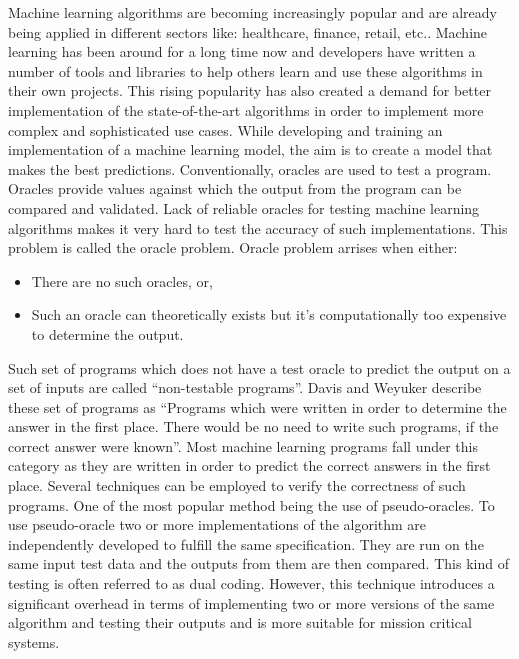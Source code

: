 Machine learning algorithms are becoming increasingly popular and are already being applied in different sectors like: healthcare, finance, retail, etc.. Machine learning has been around for a long time now and developers have written a number of tools and libraries to help others learn and use these algorithms in their own projects. This rising popularity has also created a demand for better implementation of the state-of-the-art algorithms in order to implement more complex and sophisticated use cases. While developing and training an implementation of a machine learning model, the aim is to create a model that makes the best predictions.
Conventionally, oracles are used to test a program. Oracles provide values against which the output from the program can be compared and validated. Lack of reliable oracles for testing machine learning algorithms makes it very hard to test the accuracy of such implementations. This problem is called the oracle problem\cite{Weyuker}. Oracle problem arrises when either:
\begin{itemize}
  \item There are no such oracles, or,
  \item Such an oracle can theoretically exists but it's computationally too expensive to determine the output.
\end{itemize}
Such set of programs which does not have a test oracle to predict the output on a set of inputs are called \enquote{non-testable programs}\cite{Murphy}. Davis and Weyuker describe these set of programs as \enquote{Programs which were written in order to determine the answer in the first place. There would be no need to write such programs, if the correct answer were known}\cite{}. Most machine learning programs fall under this category as they are written in order to predict the correct answers in the first place. Several techniques can be employed to verify the correctness of such programs. One of the most popular method being the use of pseudo-oracles. To use pseudo-oracle two or more implementations of the algorithm are independently developed to fulfill the same specification. They are run on the same input test data and the outputs from them are then compared. This kind of testing is often referred to as dual coding. However, this technique introduces a significant overhead in terms of implementing two or more versions of the same algorithm and testing their outputs and is more suitable for mission critical systems\cite{Weyuker}.\newline

